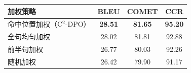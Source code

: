 \begin{table}[htbp]
\centering
{}
\label{tab:method3-weighting-ablation}
\footnotesize
\begin{tabular}{lccc}
\toprule
\textbf{加权策略} & \textbf{BLEU} & \textbf{COMET} & \textbf{CCR} \\
\midrule
命中位置加权（C$^2$-DPO） & \textbf{28.51} & \textbf{81.65} & \textbf{95.20} \\
全句均匀加权 & 28.02 & 81.81 & 92.88 \\
前半句加权 & 26.77 & 80.03 & 92.26 \\
随机加权 & 26.42 & 79.90 & 91.17 \\
\bottomrule
\end{tabular}
\end{table}
